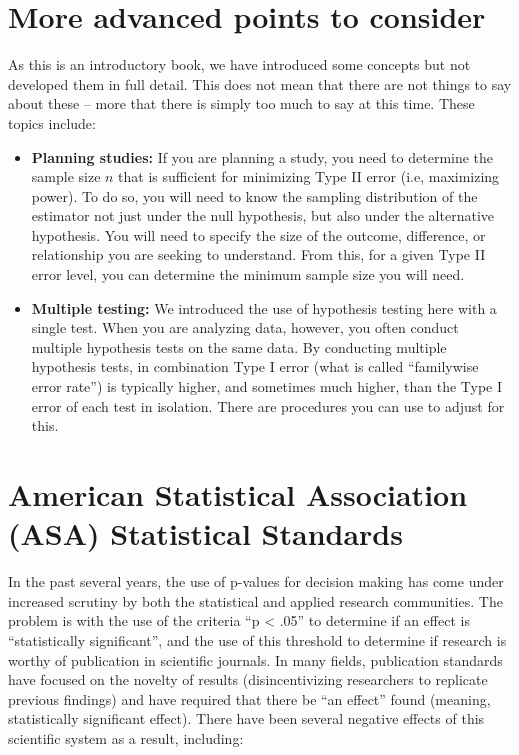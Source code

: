 \documentclass[
  letterpaper,
  DIV=11,
  numbers=noendperiod]{scrreprt}
\providecommand{\tightlist}{%
  \setlength{\itemsep}{0pt}\setlength{\parskip}{0pt}}\usepackage{longtable,booktabs,array}
\theoremstyle{definition}
\theoremstyle{remark}
\begin{document}
\hypertarget{more-advanced-points-to-consider}{%
\section{More advanced points to
consider}\label{more-advanced-points-to-consider}}

As this is an introductory book, we have introduced some concepts but
not developed them in full detail. This does not mean that there are not
things to say about these -- more that there is simply too much to say
at this time. These topics include:

\begin{itemize}
\tightlist
\item
  \textbf{Planning studies:} If you are planning a study, you need to
  determine the sample size \(n\) that is sufficient for minimizing Type
  II error (i.e, maximizing power). To do so, you will need to know the
  sampling distribution of the estimator not just under the null
  hypothesis, but also under the alternative hypothesis. You will need
  to specify the size of the outcome, difference, or relationship you
  are seeking to understand. From this, for a given Type II error level,
  you can determine the minimum sample size you will need.
\item
  \textbf{Multiple testing:} We introduced the use of hypothesis testing
  here with a single test. When you are analyzing data, however, you
  often conduct multiple hypothesis tests on the same data. By
  conducting multiple hypothesis tests, in combination Type I error
  (what is called ``familywise error rate'') is typically higher, and
  sometimes much higher, than the Type I error of each test in
  isolation. There are procedures you can use to adjust for this.
\end{itemize}

\hypertarget{american-statistical-association-asa-statistical-standards}{%
\section{American Statistical Association (ASA) Statistical
Standards}\label{american-statistical-association-asa-statistical-standards}}

In the past several years, the use of p-values for decision making has
come under increased scrutiny by both the statistical and applied
research communities. The problem is with the use of the criteria ``p
\textless{} .05'' to determine if an effect is ``statistically
significant'', and the use of this threshold to determine if research is
worthy of publication in scientific journals. In many fields,
publication standards have focused on the novelty of results
(disincentivizing researchers to replicate previous findings) and have
required that there be ``an effect'' found (meaning, statistically
significant effect). There have been several negative effects of this
scientific system as a result, including:
\end{document}
